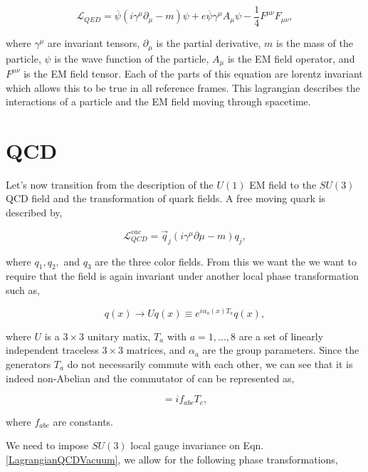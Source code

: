  \begin{equation}\label{LagrangianQED}
\mathcal{L}_{QED}=\overline{\psi}(i\gamma^\mu\partial_\mu-m)\psi+e\overline{\psi}\gamma^{\mu}A_{\mu}\psi-\frac{1}{4}F^{\mu\nu}F_{\mu\nu},
 \end{equation}

where $\gamma^\mu$ are invariant tensors, $\partial_\mu$ is the partial derivative, $m$ is the mass of the particle, $\psi$ is the wave function of the particle, $A_{\mu}$ is the EM field operator, and $F^{\mu\nu}$ is the EM field tensor. Each of the parts of this equation are lorentz invariant which allows this to be true in all reference frames. This lagrangian describes the interactions of a particle and the EM field moving through spacetime. 

\section{QCD}

Let's now transition from the description of the $U(1)$ EM field to the $SU(3)$ QCD field and the transformation of quark fields. A free moving quark is described by,

\begin{equation}\label{LagrangianQCDVacuum}
\mathcal{L}_{QCD}^{vac}=\overrightarrow{q}_j(i\gamma^\mu\partial\mu-m)q_j,
\end{equation}

where $q_1, q_2,$ and $q_3$ are the three color fields. From this we want the we want to require that the field is again invariant under another local phase transformation such as,

\begin{equation}
q(x)\rightarrow Uq(x)\equiv e^{i\alpha_a(x)T_a}q(x),
\end{equation}

where $U$ is a $3\times3$ unitary matix, $T_a$ with $a=1,...,8$ are a set of linearly independent traceless $3\times3$ matrices, and $\alpha_a$ are the group parameters. Since the generators $T_a$ do not necessarily commute with each other, we can see that it is indeed non-Abelian and the commutator of can be represented as,

\begin{equation}
[T_a, T_b]=if_{abc}T_c,
\end{equation}

where $f_{abc}$ are constants. 

We need to impose $SU(3)$ local gauge invariance on Eqn. \ref{LagrangianQCDVacuum}, we allow for the following phase transformations,

